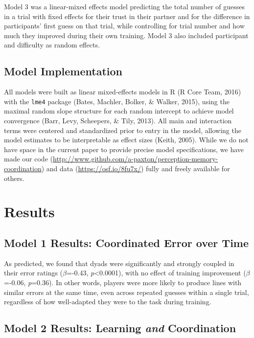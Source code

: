 \documentclass[10pt, letterpaper]{article}
\begin{document}
Model 3 was a linear-mixed effects model predicting the total number of
guesses in a trial with fixed effects for their trust in their partner
and for the difference in participants' first guess on that trial, while
controlling for trial number and how much they improved during their own
training. Model 3 also included participant and difficulty as random
effects.

\subsection{Model Implementation}\label{model-implementation}

All models were built as linear mixed-effects models in R (R Core Team,
2016) with the \texttt{lme4} package (Bates, Machler, Bolker, \& Walker,
2015), using the maximal random slope structure for each random
intercept to achieve model convergence (Barr, Levy, Scheepers, \& Tily,
2013). All main and interaction terms were centered and standardized
prior to entry in the model, allowing the model estimates to be
interpretable as effect sizes (Keith, 2005). While we do not have space
in the current paper to provide precise model specifications, we have
made our code
(\url{http://www.github.com/a-paxton/perception-memory-coordination})
and data (\url{https://osf.io/8fu7x/}) fully and freely available for
others.

\section{Results}\label{results}

\subsection{Model 1 Results: Coordinated Error over
Time}\label{model-1-results-coordinated-error-over-time}

As predicted, we found that dyads were significantly and strongly
coupled in their error ratings (\emph{\(\beta\)}=-0.43,
\emph{p}\textless{}0.0001), with no effect of training improvement
(\emph{\(\beta\)}=-0.06, \emph{p}=0.36). In other words, players were
more likely to produce lines with similar errors at the same time, even
across repeated guesses within a single trial, regardless of how
well-adapted they were to the task during training.

\subsection{\texorpdfstring{Model 2 Results: Learning \emph{and}
Coordination}{Model 2 Results: Learning and Coordination}}\label{model-2-results-learning-and-coordination}
\end{document}
